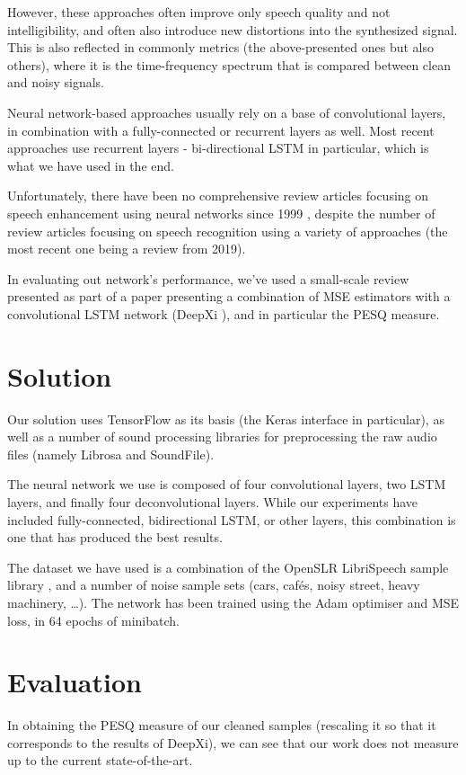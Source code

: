 \documentclass[11pt]{article}
\begin{document}
However, these approaches often improve only speech quality and not
intelligibility, and often also introduce new distortions into the synthesized
signal. This is also reflected in commonly metrics (the above-presented ones but
also others), where it is the time-frequency spectrum that is compared between
clean and noisy signals.

Neural network-based approaches usually rely on a base of convolutional layers,
in combination with a fully-connected or recurrent layers as well. Most recent
approaches use recurrent layers - bi-directional LSTM in particular, which is
what we have used in the end.

Unfortunately, there have been no comprehensive review articles focusing on
speech enhancement using neural networks since 1999 \cite{wan1999networks},
despite the number of review articles focusing on speech recognition using a
variety of approaches (the most recent one being a review
\cite{nassif2019speech} from 2019).

In evaluating out network's performance, we've used a small-scale review
presented as part of a paper presenting a combination of MSE estimators with a
convolutional LSTM network (DeepXi \cite{NICOLSON201944}), and in particular the
PESQ measure.

\section{Solution}
\label{sec:org0228d4a}
Our solution uses TensorFlow as its basis (the Keras interface in particular),
as well as a number of sound processing libraries for preprocessing the raw
audio files (namely Librosa and SoundFile).

The neural network we use is composed of four convolutional layers, two LSTM
layers, and finally four deconvolutional layers. While our experiments have
included fully-connected, bidirectional LSTM, or other layers, this combination
is one that has produced the best results.

The dataset we have used is a combination of the OpenSLR LibriSpeech sample
library \cite{7178964}, and a number of noise sample sets (cars, cafés, noisy
street, heavy machinery, \ldots{}). The network has been trained using the Adam
optimiser and MSE loss, in 64 epochs of minibatch.

\section{Evaluation}
\label{sec:org07a67a4}
In obtaining the PESQ measure of our cleaned samples (rescaling it so that it
corresponds to the results of DeepXi), we can see that our work does not measure
up to the current state-of-the-art.
\end{document}

